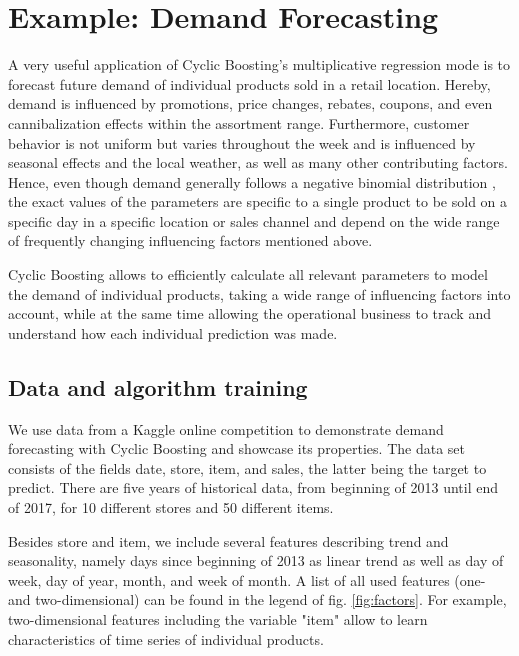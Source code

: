\documentclass[BCOR=1mm, DIV=calc,10pt,
twoside=true,
twocolumn,
headings=normal]{scrartcl}
\begin{document}
\section{Example: Demand Forecasting}
\label{demandforecasting}

A very useful application of Cyclic Boosting's multiplicative regression mode is to
forecast future demand of individual products sold in a retail location. Hereby, demand is
influenced by promotions, price changes, rebates, coupons, and even cannibalization
effects within the assortment range. Furthermore, customer behavior is not uniform but
varies throughout the week and is influenced by seasonal effects and the local weather, as
well as many other contributing factors. Hence, even though demand generally follows a
negative binomial distribution \cite{Ehrenberg1959}, the exact values of the parameters
are specific to a single product to be sold on a specific day in a specific location or
sales channel and depend on the wide range of frequently changing influencing factors
mentioned above. 

Cyclic Boosting allows to efficiently calculate all relevant parameters to model the
demand of individual products, taking a wide range of influencing factors into account,
while at the same time allowing the operational business to track and understand how each
individual prediction was made. 


\subsection{Data and algorithm training}

We use data from a Kaggle online competition \cite{kaggle_data} to demonstrate demand
forecasting with Cyclic Boosting and showcase its properties. The data set consists of the
fields date, store, item, and sales, the latter being the target to predict. There are
five years of historical data, from beginning of 2013 until end of 2017, for 10 different
stores and 50 different items. 

Besides store and item, we include several features describing trend and seasonality,
namely days since beginning of 2013 as linear trend as well as day of week, day of year,
month, and week of month. A list of all used features (one- and two-dimensional) can be
found in the legend of fig. \ref{fig:factors}. For example, two-dimensional features
including the variable "item" allow to learn characteristics of time series of individual
products.
\end{document}
